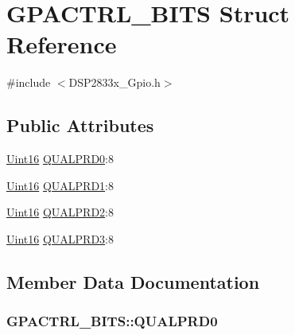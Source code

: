 \hypertarget{struct_g_p_a_c_t_r_l___b_i_t_s}{}\section{G\+P\+A\+C\+T\+R\+L\+\_\+\+B\+I\+T\+S Struct Reference}
\label{struct_g_p_a_c_t_r_l___b_i_t_s}


{\ttfamily \#include $<$D\+S\+P2833x\+\_\+\+Gpio.\+h$>$}

\subsection*{Public Attributes}
\begin{DoxyCompactItemize}
\item 
\hyperlink{_d_s_p2833x___device_8h_a59a9f6be4562c327cbfb4f7e8e18f08b}{Uint16} \hyperlink{struct_g_p_a_c_t_r_l___b_i_t_s_a381d1c5f8c215931e8111274d30445dc}{Q\+U\+A\+L\+P\+R\+D0}\+:8
\item 
\hyperlink{_d_s_p2833x___device_8h_a59a9f6be4562c327cbfb4f7e8e18f08b}{Uint16} \hyperlink{struct_g_p_a_c_t_r_l___b_i_t_s_afbe6985bf678ffcf846614bb7f1f0507}{Q\+U\+A\+L\+P\+R\+D1}\+:8
\item 
\hyperlink{_d_s_p2833x___device_8h_a59a9f6be4562c327cbfb4f7e8e18f08b}{Uint16} \hyperlink{struct_g_p_a_c_t_r_l___b_i_t_s_a1bb5e7173a98248f70106c6048d4a5a4}{Q\+U\+A\+L\+P\+R\+D2}\+:8
\item 
\hyperlink{_d_s_p2833x___device_8h_a59a9f6be4562c327cbfb4f7e8e18f08b}{Uint16} \hyperlink{struct_g_p_a_c_t_r_l___b_i_t_s_aeb7639e10787b43b4bdbe6a9e362bb53}{Q\+U\+A\+L\+P\+R\+D3}\+:8
\end{DoxyCompactItemize}


\subsection{Member Data Documentation}
\hypertarget{struct_g_p_a_c_t_r_l___b_i_t_s_a381d1c5f8c215931e8111274d30445dc}{}
\subsubsection[{Q\+U\+A\+L\+P\+R\+D0}]{ G\+P\+A\+C\+T\+R\+L\+\_\+\+B\+I\+T\+S\+::\+Q\+U\+A\+L\+P\+R\+D0}\label{struct_g_p_a_c_t_r_l___b_i_t_s_a381d1c5f8c215931e8111274d30445dc}
\hypertarget{struct_g_p_a_c_t_r_l___b_i_t_s_afbe6985bf678ffcf846614bb7f1f0507}{}
